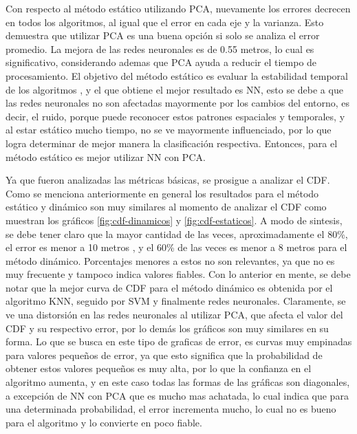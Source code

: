 Con respecto al método estático utilizando PCA, nuevamente los errores decrecen en todos los algoritmos, al igual que el error en cada eje y la varianza. Esto demuestra que utilizar PCA es una buena opción si solo se analiza el error promedio. La mejora de las redes neuronales es de 0.55 metros, lo cual es significativo, considerando ademas que PCA ayuda a reducir el tiempo de procesamiento. El objetivo del método estático es evaluar la estabilidad temporal de los algoritmos , y el que obtiene el mejor resultado es NN, esto se debe a que las redes neuronales no son afectadas mayormente por los cambios del entorno, es decir, el ruido, porque puede reconocer estos patrones espaciales y temporales, y al estar estático mucho tiempo, no se ve mayormente influenciado, por lo que logra determinar de mejor manera la clasificación respectiva. Entonces, para el método estático es mejor utilizar NN con PCA.

Ya que fueron analizadas las métricas básicas, se prosigue a analizar el CDF. Como se menciona anteriormente en general los resultados para el método estático y dinámico son muy similares al momento de analizar el CDF como muestran los gráficos \ref{fig:cdf-dinamicos} y \ref{fig:cdf-estaticos}. A modo de sintesis, se debe tener claro que la mayor cantidad de las veces, aproximadamente el 80\%, el  error es menor a 10 metros , y el 60\% de las veces es menor a 8 metros para el método dinámico. Porcentajes menores a estos no son relevantes, ya que no es muy frecuente y tampoco indica valores fiables. Con lo anterior en mente, se debe notar que la mejor curva de CDF para el método dinámico es obtenida por el algoritmo KNN, seguido por SVM y finalmente redes neuronales. Claramente, se ve una distorsión en las redes neuronales al utilizar PCA, que afecta el valor del CDF y su respectivo error, por lo demás los gráficos son muy similares en su forma. Lo que se busca en este tipo de graficas de error, es curvas muy empinadas para valores pequeños de error, ya que esto significa que la probabilidad de obtener estos valores pequeños es muy alta, por lo que la confianza en el algoritmo aumenta, y en este caso todas las formas de las gráficas son diagonales, a excepción de NN con PCA que es mucho mas achatada, lo cual indica que para una determinada probabilidad, el error incrementa mucho, lo cual no es bueno para el algoritmo y lo convierte en poco fiable.

